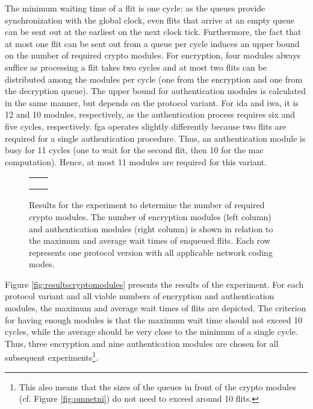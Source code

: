 The minimum waiting time of a flit is one cycle: as the queues provide synchronization with the global clock, even flits that arrive at an empty queue
can be sent out at the earliest on the next clock tick. Furthermore, the fact that at most one flit can be sent out from a queue per cycle induces an
upper bound on the number of required crypto modules. For encryption, four modules always suffice as processing a flit takes two cycles and at most two
flits can be distributed among the modules per cycle (one from the encryption and one from the decryption queue). The upper bound for authentication
modules is calculated in the same manner, but depends on the protocol variant. For \gls{ida} and \gls{iwa}, it is 12 and 10 modules, respectively, as
the authentication process requires six and five cycles, respectively. \Gls{fga} operates slightly differently because two flits are required for a
single authentication procedure. Thus, an authentication module is busy for 11 cycles (one to wait for the second flit, then 10 for the \gls{mac}
computation). Hence, at most 11 modules are required for this variant.

\begin{figure}
    \centering
    \begin{tabular}{cc}
         &  \\
         &  \\
         & 
    \end{tabular}
    \caption[Results for the number of crypto modules experiment]{Results for the experiment to determine the number of required crypto modules. The
    number of encryption modules (left column) and authentication modules (right column) is shown in relation to the maximum and average wait times of
    enqueued flits. Each row represents one protocol version with all applicable network coding modes.}
    \label{fig:resultscryptomodules}
\end{figure}

Figure \vref{fig:resultscryptomodules} presents the results of the experiment. For each protocol variant and all viable numbers of encryption and
authentication modules, the maximum and average wait times of flits are depicted. The criterion for having enough modules is that the maximum wait
time should not exceed 10 cycles, while the average should be very close to the minimum of a single cycle. Thus, three encryption and nine
authentication modules are chosen for all subsequent experiments\footnote{This also means that the sizes of the queues in front of the crypto modules
(cf. Figure \ref{fig:omnetni}) do not need to exceed around 10 flits.}.

